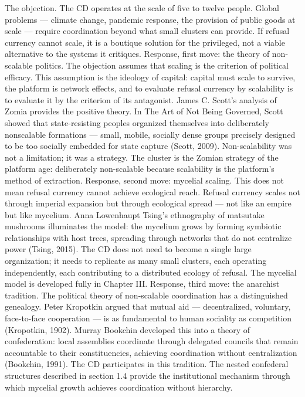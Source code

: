 The objection. The CD operates at the scale of five to twelve people. Global problems — climate change, pandemic response, the provision of public goods at scale — require coordination beyond what small clusters can provide. If refusal currency cannot scale, it is a boutique solution for the privileged, not a viable alternative to the systems it critiques. Response, first move: the theory of non-scalable politics. The objection assumes that scaling is the criterion of political efficacy. This assumption is the ideology of capital: capital must scale to survive, the platform is network effects, and to evaluate refusal currency by scalability is to evaluate it by the criterion of its antagonist. James C. Scott’s analysis of Zomia provides the positive theory. In The Art of Not Being Governed, Scott showed that state-resisting peoples organized themselves into deliberately nonscalable formations — small, mobile, socially dense groups precisely designed to be too socially embedded for state capture (Scott, 2009). Non-scalability was not a limitation; it was a strategy. The cluster is the Zomian strategy of the platform age: deliberately non-scalable because scalability is the platform’s method of extraction. Response, second move: mycelial scaling. This does not mean refusal currency cannot achieve ecological reach. Refusal currency scales not through imperial expansion but through ecological spread — not like an empire but like mycelium. Anna Lowenhaupt Tsing’s ethnography of matsutake mushrooms illuminates the model: the mycelium grows by forming symbiotic relationships with host trees, spreading through networks that do not centralize power (Tsing, 2015). The CD does not need to become a single large organization; it needs to replicate as many small clusters, each operating independently, each contributing to a distributed ecology of refusal. The mycelial model is developed fully in Chapter III. Response, third move: the anarchist tradition. The political theory of non-scalable coordination has a distinguished genealogy. Peter Kropotkin argued that mutual aid — decentralized, voluntary, face-to-face cooperation — is as fundamental to human sociality as competition (Kropotkin, 1902). Murray Bookchin developed this into a theory of confederation: local assemblies coordinate through delegated councils that remain accountable to their constituencies, achieving coordination without centralization (Bookchin, 1991). The CD participates in this tradition. The nested confederal structures described in section 1.4 provide the institutional mechanism through which mycelial growth achieves coordination without hierarchy.


